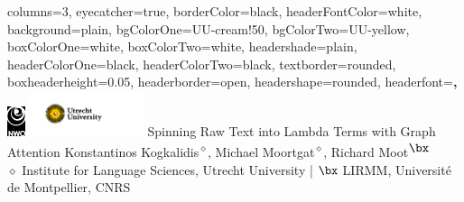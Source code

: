 \documentclass[landscape,a0paper,fontscale=0.285]{baposter}
\begin{document}
\begin{poster}{
  columns=3,
  eyecatcher=true,
  borderColor=black,
  headerFontColor=white,
  background=plain,
  bgColorOne=UU-cream!50,
  bgColorTwo=UU-yellow,
  boxColorOne=white,
  boxColorTwo=white,
  headershade=plain,
  headerColorOne=black,
  headerColorTwo=black,
  textborder=rounded,
  boxheaderheight=0.05\textheight,
  headerborder=open,
  headershape=rounded,
  headerfont=\large\textbf,
}
{\hspace{50pt}\includegraphics[width=0.04\textwidth]{NWO logo - zw.png}
\hspace{25pt}
{\includegraphics[width=0.25\textwidth,trim={1cm 1cm 1cm 1cm},clip]{UU_logo_2021_EN_rgb.png}}
}
{\huge Spinning Raw Text into Lambda Terms with Graph Attention}
{\Large
    Konstantinos Kogkalidis\textsuperscript{$\diamond$},
    Michael Moortgat\textsuperscript{$\diamond$},
    Richard Moot\textsuperscript{$\bx$}\\
    {\large
    {$\diamond$} Institute for Language Sciences, Utrecht University | {$\bx$} LIRMM, Universit\'{e} de Montpellier, CNRS
    }
}


\end{poster}
\end{document}
